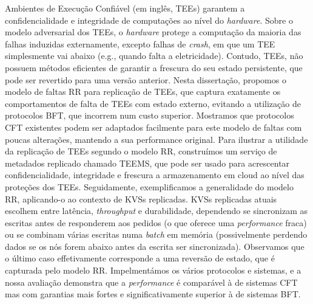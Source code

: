 \acresetall
\noindent Ambientes de Execução Confiável (em inglês, TEEs)
garantem a confidencialidade e integridade de computações ao
nível do \textit{hardware}. Sobre o modelo adversarial dos TEEs, o
\textit{hardware} protege a computação da maioria das falhas
induzidas externamente, excepto falhas de \textit{crash}, em que
um TEE simplesmente vai abaixo (e.g., quando falta a
eletricidade). Contudo, TEEs, não possuem métodos eficientes de
garantir a frescura do seu estado persistente, que pode ser
revertido para uma versão anterior. Nesta dissertação, propomos o
modelo de faltas \ac{RR} para replicação de TEEs, que captura
exatamente os comportamentos de falta de TEEs com estado externo,
evitando a utilização de protocolos BFT, que incorrem num custo
superior. Mostramos que protocolos CFT existentes podem ser
adaptados facilmente para este modelo de faltas com poucas
alterações, mantendo a sua performance original.
\vskip -0cm
Para ilustrar a utilidade da replicação de TEEs segundo o
modelo RR, construímos um serviço de metadados replicado chamado
TEEMS, que pode ser usado para acrescentar confidencialidade,
integridade e frescura a armazenamento em cloud ao nível das
proteções dos TEEs. Seguidamente, exemplificamos a generalidade
do modelo RR, aplicando-o ao contexto de KVSs replicadas. KVSs
replicadas atuais escolhem entre latência, \textit{throughput} e
durabilidade, dependendo se sincronizam as escritas antes de
responderem aos pedidos (o que oferece uma \textit{performance}
fraca) ou se combinam várias escritas numa \textit{batch} em
memória (possivelmente perdendo dados se os nós forem abaixo
antes da escrita ser sincronizada). Observamos que o último
caso effetivamente corresponde a uma reversão de estado, que é
capturada pelo modelo RR.
\vskip 0cm
Impelmentámos os vários protocolos e sistemas, e a nossa
avaliação demonstra que a \textit{performance} é comparável à de
sistemas CFT mas com garantias mais fortes e significativamente
superior à de sistemas BFT.
